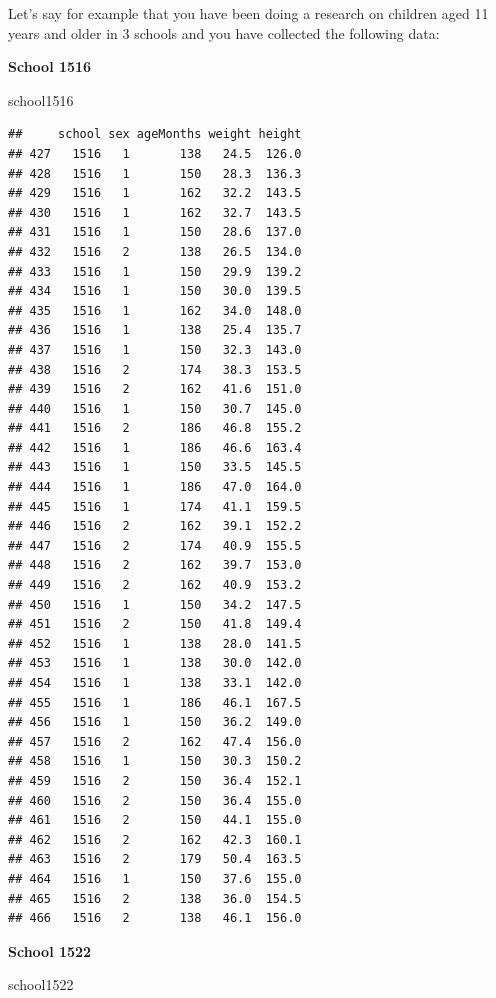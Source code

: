 \documentclass[
  12pt,
]{book}
\newenvironment{Shaded}{\begin{snugshade}}{\end{snugshade}}
\newcommand{\NormalTok}[1]{#1}
\begin{document}
Let's say for example that you have been doing a research on children aged 11 years and older in 3 schools and you have collected the following data:

\textbf{School 1516}

\begin{Shaded}
\begin{Highlighting}[]
\NormalTok{school1516}
\end{Highlighting}
\end{Shaded}

\begin{verbatim}
##     school sex ageMonths weight height
## 427   1516   1       138   24.5  126.0
## 428   1516   1       150   28.3  136.3
## 429   1516   1       162   32.2  143.5
## 430   1516   1       162   32.7  143.5
## 431   1516   1       150   28.6  137.0
## 432   1516   2       138   26.5  134.0
## 433   1516   1       150   29.9  139.2
## 434   1516   1       150   30.0  139.5
## 435   1516   1       162   34.0  148.0
## 436   1516   1       138   25.4  135.7
## 437   1516   1       150   32.3  143.0
## 438   1516   2       174   38.3  153.5
## 439   1516   2       162   41.6  151.0
## 440   1516   1       150   30.7  145.0
## 441   1516   2       186   46.8  155.2
## 442   1516   1       186   46.6  163.4
## 443   1516   1       150   33.5  145.5
## 444   1516   1       186   47.0  164.0
## 445   1516   1       174   41.1  159.5
## 446   1516   2       162   39.1  152.2
## 447   1516   2       174   40.9  155.5
## 448   1516   2       162   39.7  153.0
## 449   1516   2       162   40.9  153.2
## 450   1516   1       150   34.2  147.5
## 451   1516   2       150   41.8  149.4
## 452   1516   1       138   28.0  141.5
## 453   1516   1       138   30.0  142.0
## 454   1516   1       138   33.1  142.0
## 455   1516   1       186   46.1  167.5
## 456   1516   1       150   36.2  149.0
## 457   1516   2       162   47.4  156.0
## 458   1516   1       150   30.3  150.2
## 459   1516   2       150   36.4  152.1
## 460   1516   2       150   36.4  155.0
## 461   1516   2       150   44.1  155.0
## 462   1516   2       162   42.3  160.1
## 463   1516   2       179   50.4  163.5
## 464   1516   1       150   37.6  155.0
## 465   1516   2       138   36.0  154.5
## 466   1516   2       138   46.1  156.0
\end{verbatim}

\textbf{School 1522}

\begin{Shaded}
\begin{Highlighting}[]
\NormalTok{school1522}
\end{Highlighting}
\end{Shaded}
\end{document}
